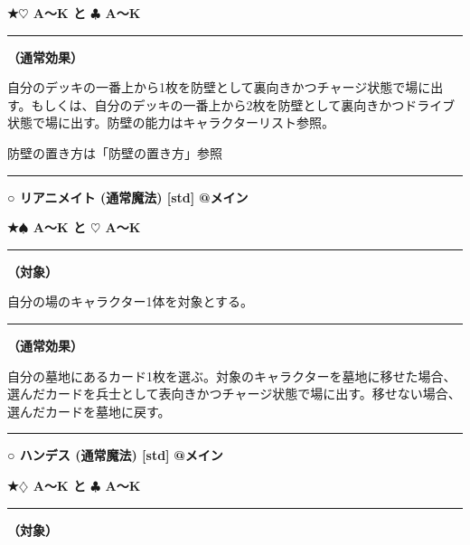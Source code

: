 \documentclass[twocolumn,a5paper,papersize,10pt]{jarticle}
\begin{document}
{\footnotesize\bf ★{\normalsize $\heartsuit$} A〜K と {\normalsize $\clubsuit$} A〜K}

\vspace{1mm}%
\hrule height 0.1mm depth 0mm width 66.5mm %
\vspace{1mm}%

{\bf（通常効果）}

自分のデッキの一番上から1枚を防壁として裏向きかつチャージ状態で場に出す。もしくは、自分のデッキの一番上から2枚を防壁として裏向きかつドライブ状態で場に出す。防壁の能力はキャラクターリスト参照。

防壁の置き方は「防壁の置き方」参照
\vspace{2mm} %
\hrule height 0.5mm depth 0mm width 66.5mm %
\vspace{1mm} %
{\small\bf ○ リアニメイト {\scriptsize (通常魔法) [std]}} %
\hfill 
{\footnotesize\bf @メイン }

{\footnotesize\bf ★{\normalsize $\spadesuit$} A〜K と {\normalsize $\heartsuit$} A〜K}

\vspace{1mm}%
\hrule height 0.1mm depth 0mm width 66.5mm %
\vspace{1mm}%
{\bf（対象）}

自分の場のキャラクター1体を対象とする。
\vspace{1mm}%
\hrule height 0.1mm depth 0mm width 66.5mm %
\vspace{1mm}%

{\bf（通常効果）}

自分の墓地にあるカード1枚を選ぶ。対象のキャラクターを墓地に移せた場合、選んだカードを兵士として表向きかつチャージ状態で場に出す。移せない場合、選んだカードを墓地に戻す。
\vspace{2mm} %
\hrule height 0.5mm depth 0mm width 66.5mm %
\vspace{1mm} %
{\small\bf ○ ハンデス {\scriptsize (通常魔法) [std]}} %
\hfill 
{\footnotesize\bf @メイン }

{\footnotesize\bf ★{\normalsize $\diamondsuit$} A〜K と {\normalsize $\clubsuit$} A〜K}

\vspace{1mm}%
\hrule height 0.1mm depth 0mm width 66.5mm %
\vspace{1mm}%
{\bf（対象）}
\end{document}
